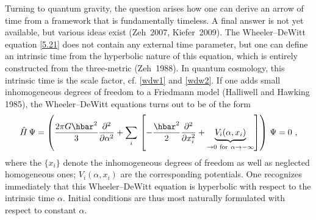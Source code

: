 \documentclass[12pt]{article}
\newcommand{\lb}{\label}
\begin{document}
Turning to quantum gravity, the question arises how one can derive an
arrow of time from a framework that is fundamentally timeless. A final
answer is not yet available, but various ideas exist (Zeh~2007,
Kiefer~2009). The Wheeler--DeWitt equation \eqref{5.21} does not
contain any external time parameter, but one can define an intrinsic
time from the hyperbolic
nature of this equation, which is entirely constructed from the
three-metric (Zeh~1988). In quantum cosmology, this intrinsic time is
the scale factor, cf. \eqref{wdw1} and \eqref{wdw2}. 
If one adds small inhomogeneous degrees of freedom to a Friedmann
model (Halliwell and Hawking 1985), the Wheeler--DeWitt equations
turns out to be of the form
\begin{equation}
\lb{3WdW2}
 \hat{H} \, \Psi = \left(\frac{2\pi G\hbar^2}{3}
\frac{\partial^2}{\partial\alpha^2} + \sum_i \, \left[
-\frac{\hbar^2}{2}
\frac{\partial^2}{\partial x_i^2}+\underbrace{V_i(\alpha,x_i)}_{\to 0\ 
{\rm for}\ \alpha
\rightarrow -\infty}\right]\right) \, \Psi = 0 \ ,
\end{equation}
where the $\{ x_i\}$ denote the inhomogeneous
degrees of freedom as well as neglected homogeneous ones;
$V_i(\alpha,x_i)$ are the corresponding potentials. One
recognizes immediately that this Wheeler--DeWitt equation is
hyperbolic with respect to the intrinsic time $\alpha$. Initial
conditions are thus most naturally formulated with respect to constant
$\alpha$. 
\end{document}
